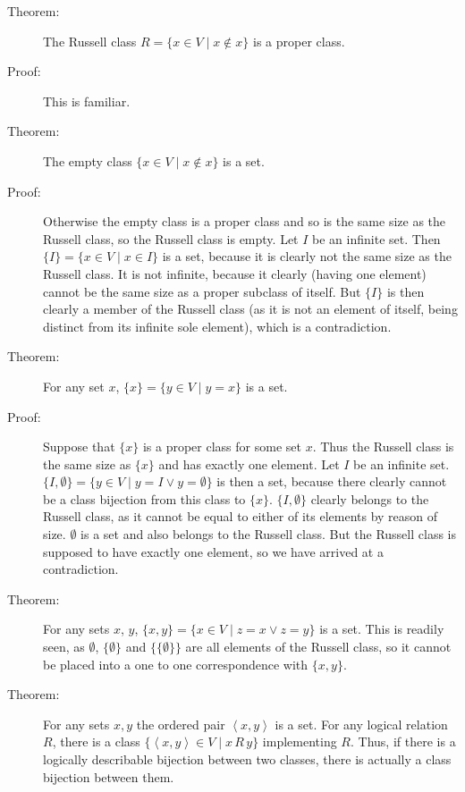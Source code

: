 \documentclass[12pt]{book}
\begin{document}
\begin{description}

\item[Theorem:]  The Russell class $R= \{x \in V\mid x \not\in x\}$ is a proper class.

\item[Proof:]  This is familiar.

\item[Theorem:]  The empty class $\{x \in V \mid x \not\in x\}$ is a set.

\item[Proof:]  Otherwise the empty class is a proper class and so is the same size as the Russell class, so the Russell class is empty.  Let $I$ be an infinite set.
Then $\{I\} = \{x \in V \mid x \in I\}$ is a set, because it is clearly not the same size as the Russell class.  It is not infinite,
because it clearly (having one element) cannot be the same size as a proper subclass of itself.  But $\{I\}$ is then clearly a member of the Russell class
(as it is not an element of itself, being distinct from its infinite sole element), which is a contradiction.

\item[Theorem:]  For any set $x$, $\{x\} = \{y \in V\mid y=x\}$ is a set.

\item[Proof:]  Suppose that $\{x\}$ is a proper class for some set $x$.  Thus the Russell class is the same size as $\{x\}$ and has exactly one element.  Let $I$ be an infinite set.  $\{I,\emptyset\} = \{y \in V \mid y=I \vee y = \emptyset\}$ is then a set, because there clearly cannot be a class bijection from this class to $\{x\}$.  $\{I,\emptyset\}$ clearly belongs to the Russell class, as it cannot be equal to either of its elements by reason of size.
$\emptyset$ is a set and also belongs to the Russell class.  But the Russell class is supposed to have exactly one element, so we have arrived at a contradiction.

\item[Theorem:]  For any sets $x$, $y$, $\{x,y\} = \{x \in V\mid z=x \vee z=y\}$ is a set.  This is readily seen, as $\emptyset$, $\{\emptyset\}$
and $\{\{\emptyset\}\}$ are all elements of the Russell class, so it cannot be placed into a one to one correspondence with $\{x,y\}$.

\item[Theorem:]  For any sets $x,y$ the ordered pair $\left<x,y\right>$ is a set.  For any logical relation $R$, there is a class
$\{\left<x,y\right> \in V \mid x\,R\,y\}$ implementing $R$.  Thus, if there is a logically describable bijection between two classes, there is actually a class bijection between them.


\end{description}
\end{document}

